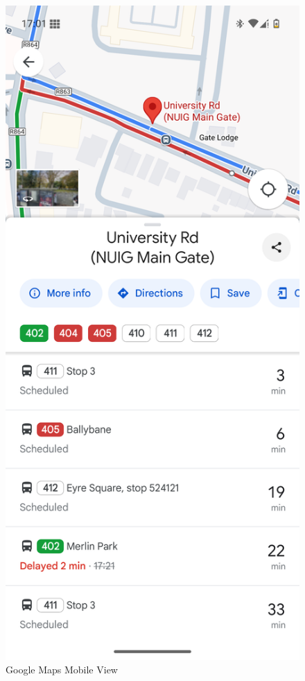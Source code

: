 \documentclass[a4paper,11pt]{article}
\begin{document}
\begin{minipage}{0.20\textwidth} 
\begin{figure}[H]
    \centering
    \includegraphics[width=\textwidth]{./images/gmobile.png}
    \caption{Google Maps Mobile View}
\end{figure}
\end{minipage}
\end{document}

